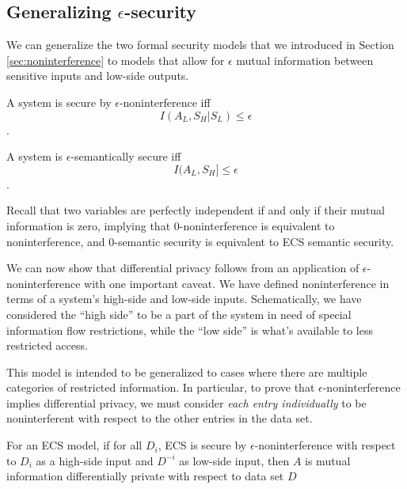 \documentclass[../thesis.tex]{subfiles}
\begin{document}
\subsection{Generalizing $\epsilon$-security}

We can generalize the two formal security models
that we introduced in Section \ref{sec:noninterference}
to models
that allow for $\epsilon$ mutual information between
sensitive inputs and low-side outputs.

\begin{dfn}
  A system is secure by $\epsilon$-noninterference iff 
  $$I(A_L, S_H \vert S_L) \leq \epsilon$$.
\end{dfn}

\begin{dfn}
  A system is $\epsilon$-semantically secure iff 
  $$I(A_L, S_H] \leq \epsilon$$.
\end{dfn}

Recall that two variables are perfectly independent
if and only if their mutual information is zero,
implying that $0$-noninterference is equivalent to
noninterference, and $0$-semantic security is equivalent
to ECS semantic security.

We can now show that differential privacy follows
from an application of $\epsilon$-noninterference
with one important caveat.
We have defined noninterference in terms of a system's
high-side and low-side inputs.
Schematically, we have considered the ``high side'' to
be a part of the system in need of special information
flow restrictions, while the ``low side'' is what's
available to less restricted access.

This model is intended to be generalized to cases where
there are multiple categories of restricted information.
In particular, to prove that $\epsilon$-noninterference
implies differential privacy, we must consider
\emph{each entry individually} to be noninterferent
with respect to the other entries in the data set.

\begin{thm}
  For an ECS model, if for all $D_i$,
  ECS is secure by $\epsilon$-noninterference with
  respect to $D_i$ as a high-side input and $D^{-i}$
  as low-side input, then $A$ is mutual information
  differentially
  private with respect to data set $D$
\end{thm}
\end{document}
